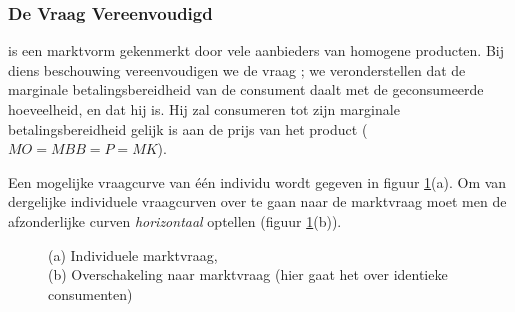 \subsubsection{De Vraag Vereenvoudigd}\label{sec:vraageenvoudig}

 is een marktvorm gekenmerkt door vele aanbieders van homogene producten. Bij diens beschouwing vereenvoudigen we de vraag ; we veronderstellen dat de marginale betalingsbereidheid van de consument daalt met de geconsumeerde hoeveelheid, en dat hij  is. Hij zal consumeren tot zijn marginale betalingsbereidheid gelijk is aan de prijs van het product ($MO=MBB=P=MK$).\\

\par Een mogelijke vraagcurve van \'e\'en individu wordt gegeven in figuur \ref{fig:h3vraag}(a). Om van dergelijke individuele vraagcurven over te gaan naar de marktvraag moet men de afzonderlijke curven \textit{horizontaal} optellen (figuur \ref{fig:h3vraag}(b)).

\begin{figure}[H]
\centering
\captionsetup{justification=centering,margin=2cm}
\caption{(a) Individuele marktvraag, \\(b) Overschakeling naar marktvraag (hier gaat het over identieke consumenten)}
\label{fig:h3vraag}
\end{figure}

